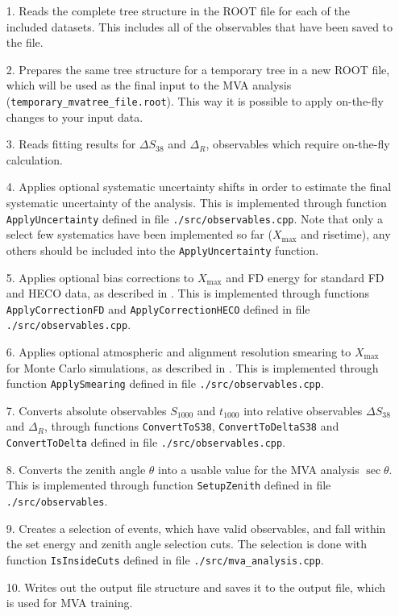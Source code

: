 \documentclass[12pt,a4paper]{report}
\begin{document}
\begin{itemize}
\item[1.] Reads the complete tree structure in the ROOT file for each of the included datasets. This includes all of the observables that have been saved to the file.
\item[2.] Prepares the same tree structure for a temporary tree in a new ROOT file, which will be used as the final input to the MVA analysis (\texttt{temporary\_mvatree\_file.root}). This way it is possible to apply on-the-fly changes to your input data.
\item[3.] Reads fitting results for $\Delta S_{38}$ and $\Delta_R$, observables which require on-the-fly calculation.
\item[4.] Applies optional systematic uncertainty shifts in order to estimate the final systematic uncertainty of the analysis. This is implemented through function \texttt{ApplyUncertainty} defined in file \texttt{./src/observables.cpp}. Note that only a select few systematics have been implemented so far ($X_{\textrm{max}}$ and risetime), any others should be included into the \texttt{ApplyUncertainty} function.
\item[5.] Applies optional bias corrections to $X_{\textrm{max}}$ and FD energy for standard FD and HECO data, as described in \cite{CompositionAugerWiki}. This is implemented through functions \texttt{ApplyCorrectionFD} and \texttt{ApplyCorrectionHECO} defined in file \texttt{./src/observables.cpp}.
\item[6.] Applies optional atmospheric and alignment resolution smearing to $X_{\textrm{max}}$ for Monte Carlo simulations, as described in \cite{xmaxMoments,xmaxUnger}. This is implemented through function \texttt{ApplySmearing} defined in file \texttt{./src/observables.cpp}.
\item[7.] Converts absolute observables $S_{1000}$ and $t_{1000}$ into relative observables $\Delta S_{38}$ and $\Delta_R$, through functions \texttt{ConvertToS38}, \texttt{ConvertToDeltaS38} and \texttt{ConvertToDelta} defined in file \texttt{./src/observables.cpp}.
\item[8.] Converts the zenith angle $\theta$ into a usable value for the MVA analysis $\sec \theta$. This is implemented through function \texttt{SetupZenith} defined in file \texttt{./src/observables}.
\item[9.] Creates a selection of events, which have valid observables, and fall within the set energy and zenith angle selection cuts. The selection is done with function \texttt{IsInsideCuts} defined in file \texttt{./src/mva\_analysis.cpp}.
\item[10.] Writes out the output file structure and saves it to the output file, which is used for MVA training.
\end{itemize}
\end{document}
